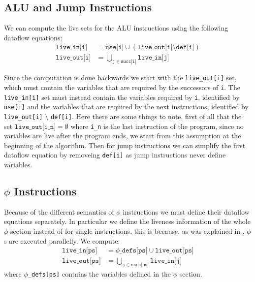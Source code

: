 \subsection{ALU and Jump Instructions}

We can compute the live sets for the ALU instructions using the following dataflow equations:
\begin{align*}
  \texttt{live\_in[i]} &= \texttt{use[i]} \cup (\texttt{live\_out[i]} \setminus \texttt{def[i]}) \\
  \texttt{live\_out[i]} &= \bigcup \limits_{\texttt j \in \texttt{succ[i]}} \texttt{live\_in[j]}
\end{align*}

Since the computation is done backwards we start with the \texttt{live\_out[i]} set, which must contain the variables that are required by the successors of \texttt i. The
\texttt{live\_in[i]} set must instead contain the variables required by \texttt i, identified by \texttt{use[i]} and the variables that are required by the next instructions, identified by \texttt{live\_out[i]} $\setminus$ \texttt{def[i]}.
Here there are some things to note, first of all that the set $\texttt{live\_out[i\_n]} = \emptyset$ where \texttt{i\_n} is the last instruction of the program, since no variables are live after the program ends, we start from this assumption at the beginning of the algorithm.
Then for jump instructions we can simplify the first dataflow equation by removeing \texttt{def[i]} as jump instructions never define variables.

\subsection{$\phi$ Instructions}

Because of the different semantics of $\phi$ instructions we must define their dataflow equations separately. In particular we define the liveness information of the whole $\phi$ section instead of for single instructions, this is because, as was explained in , $\phi$s are executed parallelly.
We compute:
\begin{align*}
  \texttt{live\_in[ps]} &= \texttt{$\phi$\_defs[ps]} \cup \texttt{live\_out[ps]} \\
  \texttt{live\_out[ps]} &= \bigcup \limits_{\texttt j \in \texttt{succ[ps]}} \texttt{live\_in[j]}
\end{align*}
where \texttt{$\phi$\_defs[ps]} contains the variables defined in the $\phi$ section.

